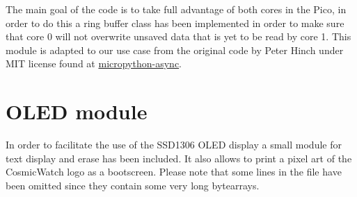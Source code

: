 The main goal of the code is to take full advantage of both cores in the Pico, in order to do this a ring buffer class has been implemented in order to make sure that core 0 will not overwrite unsaved data that is yet to be read by core 1. This module is adapted to our use case from the original code by Peter Hinch under MIT license found at \href{https://github.com/peterhinch/micropython-async/blob/master/v3/primitives/ringbuf_queue.py}{micropython-async}.



\section{OLED module}

In order to facilitate the use of the SSD1306 OLED display a small module for text display and erase has been included. It also allows to print a pixel art of the CosmicWatch logo as a bootscreen. Please note that some lines in the file have been omitted since they contain some very long bytearrays.

